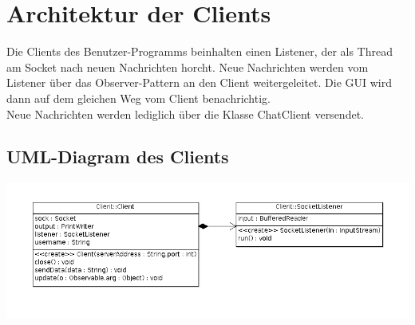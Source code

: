 \documentclass[a4paper, oneside]{scrreprt}
\begin{document}
\chapter{Architektur der Clients}
Die Clients des Benutzer-Programms beinhalten einen Listener, der als Thread am Socket nach neuen Nachrichten horcht. Neue Nachrichten werden vom Listener über das Observer-Pattern an den Client weitergeleitet. Die GUI wird dann auf dem gleichen Weg vom Client benachrichtig.\\
Neue Nachrichten werden lediglich über die Klasse ChatClient versendet.

\section{UML-Diagram des Clients}

\includegraphics[scale=0.6]{data/RNPA2Client.png}
\end{document}
